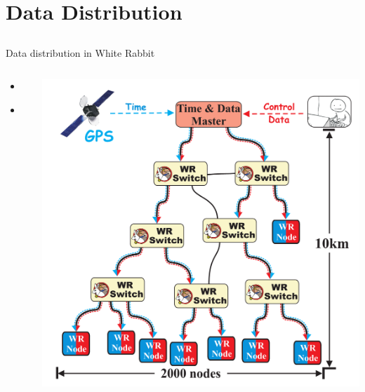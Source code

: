 \documentclass[compress,red]{beamer}
\begin{document}
\section{Data Distribution}
\subsection{}
\begin{frame}{Data distribution in White Rabbit}


\begin{columns}[c]
 
  \begin{itemize}
    \item \color{gray}{High accuracy/precision synchronization}
    \item \textbf{\color{red}{Deterministic, reliable and low-latency Control Data delivery}}
  \end{itemize}

    \begin{center}
    \includegraphics[height=1.0\textwidth]{network/wr_network-new.pdf}
    \end{center}
\end{columns}

\end{frame}
\end{document}
